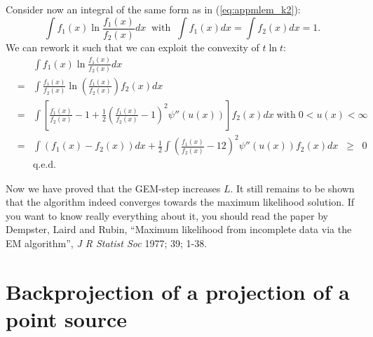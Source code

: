 Consider now an integral of the same form as in (\ref{eq:appmlem_k2}):
\begin{equation}
  \int f_1(x) \ln \frac{f_1(x)}{f_2(x)} dx \;\; \mbox{with} \;\;
  \int f_1(x) dx = \int f_2(x) dx = 1.
\end{equation}
We can rework it such that we can exploit the convexity of $t \ln t$:
\begin{align}
  & &  \int f_1(x) \ln \frac{f_1(x)}{f_2(x)} dx \nonumber\\
  & = & \int \frac{f_1(x)}{f_2(x)} \ln \left( \frac{f_1(x)}{f_2(x)} \right)
        f_2(x) dx \nonumber\\
  & = & \int \left[ \frac{f_1(x)}{f_2(x)} -1 + 
       \frac{1}{2}\left( \frac{f_1(x)}{f_2(x)} - 1\right)^2 
        \psi''(u(x)) \right]  f_2(x) dx \; \mbox{with} \; 0 < u(x) < \infty 
        \nonumber\\
  & = & \int \left( f_1(x) - f_2(x) \right) dx + 
        \frac{1}{2} \int \left( \frac{f_1(x)}{f_2(x)} - 1 2\right)^2
        \psi''(u(x)) f_2(x) dx \;\; \geq \;\; 0 \nonumber\\
  & & \mbox{q.e.d.} \nonumber
\end{align}

Now we have proved that the GEM-step increases $L$. It still remains
to be shown that the algorithm indeed converges towards the maximum
likelihood solution. If you want to know really everything about it, you
should read the paper by Dempster, Laird and Rubin, ``Maximum
likelihood from incomplete data via the EM algorithm'', {\em J R
Statist Soc} 1977; 39; 1-38.


\newpage
\section{Backprojection of a projection of a point source} \label{app:bprojproj}
